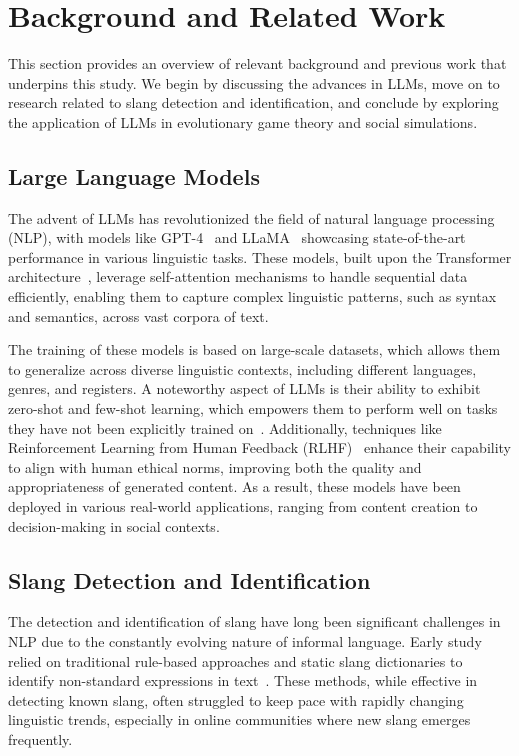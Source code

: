 \section{Background and Related Work}
\label{sec: RelatedWork}
This section provides an overview of relevant background and previous work that underpins this study. We begin by discussing the advances in LLMs, move on to research related to slang detection and identification, and conclude by exploring the application of LLMs in evolutionary game theory and social simulations.

\subsection{Large Language Models}
The advent of LLMs has revolutionized the field of natural language processing (NLP), with models like  GPT-4~\cite{openai2024gpt4technicalreport} and LLaMA~\cite{touvron2023llama} showcasing state-of-the-art performance in various linguistic tasks. These models, built upon the Transformer architecture~\cite{vaswani2017attention}, leverage self-attention mechanisms to handle sequential data efficiently, enabling them to capture complex linguistic patterns, such as syntax and semantics, across vast corpora of text.


The training of these models is based on large-scale datasets, which allows them to generalize across diverse linguistic contexts, including different languages, genres, and registers. A noteworthy aspect of LLMs is their ability to exhibit zero-shot and few-shot learning, which empowers them to perform well on tasks they have not been explicitly trained on~\cite{li2024exploring,Zhao2023ASO,Wang2023ASO,10.1145/3686803}. Additionally, techniques like Reinforcement Learning from Human Feedback (RLHF)~\cite{instructGPT} enhance their capability to align with human ethical norms, improving both the quality and appropriateness of generated content. As a result, these models have been deployed in various real-world applications, ranging from content creation to decision-making in social contexts.

\subsection{Slang Detection and Identification}
The detection and identification of slang have long been significant challenges in NLP due to the constantly evolving nature of informal language. Early study relied on traditional rule-based approaches and static slang dictionaries to identify non-standard expressions in text~\cite{Wang_icceasia23}. These methods, while effective in detecting known slang, often struggled to keep pace with rapidly changing linguistic trends, especially in online communities where new slang emerges frequently.


